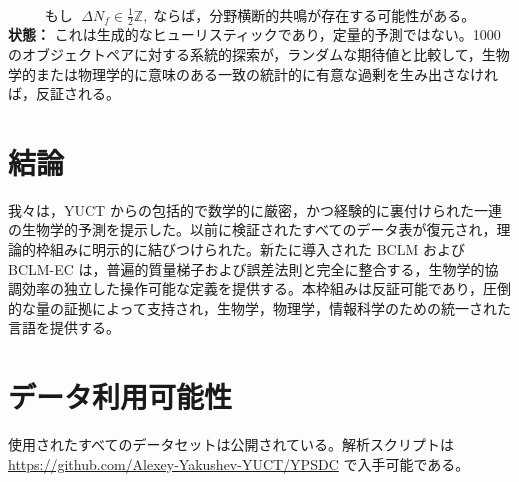 \documentclass[11pt,a4paper]{article}
\begin{document}
	\begin{equation}\label{eq:pred-hg}
		\text{もし }\; \Delta N_f \in \tfrac12\mathbb{Z},\;
		\text{ならば，分野横断的共鳴が存在する可能性がある。}
	\end{equation}
	\textbf{状態：} これは生成的なヒューリスティックであり，定量的予測ではない。1000 のオブジェクトペアに対する系統的探索が，ランダムな期待値と比較して，生物学的または物理学的に意味のある一致の統計的に有意な過剰を生み出さなければ，反証される。
	
	\section{結論}
	
	我々は，YUCT からの包括的で数学的に厳密，かつ経験的に裏付けられた一連の生物学的予測を提示した。以前に検証されたすべてのデータ表が復元され，理論的枠組みに明示的に結びつけられた。新たに導入された BCLM および BCLM-EC は，普遍的質量梯子および誤差法則と完全に整合する，生物学的協調効率の独立した操作可能な定義を提供する。本枠組みは反証可能であり，圧倒的な量の証拠によって支持され，生物学，物理学，情報科学のための統一された言語を提供する。
	
	\section*{データ利用可能性}
	
	使用されたすべてのデータセットは公開されている。解析スクリプトは \url{https://github.com/Alexey-Yakushev-YUCT/YPSDC} で入手可能である。
	
\end{document}
